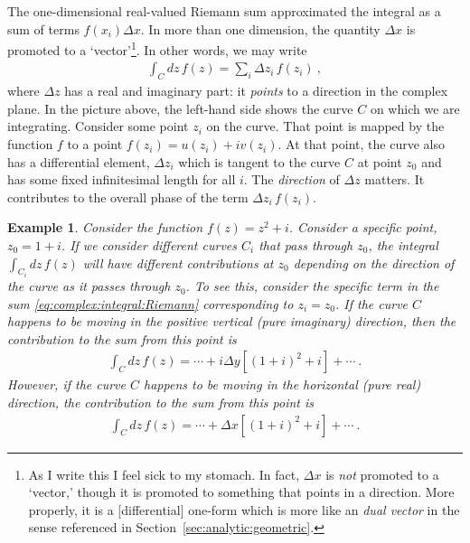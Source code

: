 \documentclass[
  11pt,
	colorful,
	raggedright,
]{tufte-style-thesis-flip}
\newtheorem{example}{Example}[section]
\begin{document}
The one-dimensional real-valued Riemann sum approximated the integral as a sum of terms $f(x_i)\Delta x$. In more than one dimension, the quantity $\Delta x$ is promoted to a `vector'\footnote{As I write this I feel sick to my stomach. In fact, $\Delta x$ is \emph{not} promoted to a `vector,' though it is promoted to something that points in a direction. More properly, it is a [differential] one-form which is more like an \emph{dual vector} in the sense referenced in Section~\ref{sec:analytic:geometric}.}. In other words, we may write
\begin{align}
  \int_C dz\, f(z) = \sum_i \Delta z_i \, f(z_i) \ ,
  \label{eq:complex:integral:Riemann}
\end{align}
where $\Delta z$ has a real and imaginary part: it \emph{points} to a direction in the complex plane. In the picture above, the left-hand side shows the curve $C$ on which we are integrating. Consider some point $z_i$ on the curve. That point is mapped by the function $f$ to a point $f(z_i) = u(z_i)+iv(z_i)$. At that point, the curve also has a differential element, $\Delta z_i$ which is tangent to the curve $C$ at point $z_0$ and has some fixed infinitesimal length for all $i$. The \emph{direction} of $\Delta z$ matters. It contributes to the overall phase of the term $\Delta z_i \, f(z_i)$.
\begin{example}
Consider the function $f(z) = z^2+i$.  Consider a specific point, $z_0 = 1+i$. If we consider different curves $C_i$ that pass through $z_0$, the integral $\int_{C_i}dz\,f(z)$ will have different contributions at $z_0$ depending on the \emph{direction of the curve} as it passes through $z_0$. To see this, consider the specific term in the sum \eqref{eq:complex:integral:Riemann} corresponding to $z_i = z_0$. If the curve $C$ happens to be moving in the positive vertical (pure imaginary) direction, then the contribution to the sum from this point is
\begin{align}
  \int_C dz\, f(z) = \cdots + i\Delta y\left[(1+i)^2 + i\right] + \cdots \ .
\end{align}
However, if the curve $C$ happens to be moving in the horizontal (pure real) direction, the contribution to the sum from this point is
\begin{align}
  \int_C dz\, f(z) = \cdots + \Delta x\left[(1+i)^2 + i\right] + \cdots \ .
\end{align}
\end{example}
\end{document}
